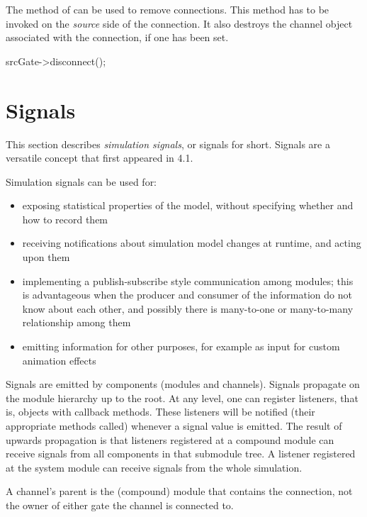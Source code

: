 \begin{ned}
The  method of  can be
used to remove connections. This method has to be invoked
on the \textit{source} side of the connection. It also destroys
the channel object associated with the connection, if one has been set.

\begin{cpp}
srcGate->disconnect();
\end{cpp}



\section{Signals}
\label{sec:simple-modules:signals}

This section describes \textit{simulation signals}, or signals for short.
Signals are a versatile concept that first appeared in {\opp} 4.1.

Simulation signals can be used for:

\begin{itemize}
  \item exposing statistical properties of the model, without specifying
        whether and how to record them
  \item receiving notifications about simulation model changes at runtime, and
        acting upon them
  \item implementing a publish-subscribe style communication among modules;
        this is advantageous when the producer and consumer of the information
        do not know about each other, and possibly there is many-to-one or
        many-to-many relationship among them
  \item emitting information for other purposes, for example as input for
        custom animation effects
\end{itemize}

Signals are emitted by components (modules and channels). Signals propagate on
the module hierarchy up to the root. At any level, one can register listeners,
that is, objects with callback methods. These listeners will be notified (their
appropriate methods called) whenever a signal value is emitted. The result of
upwards propagation is that listeners registered at a compound module can
receive signals from all components in that submodule tree. A listener
registered at the system module can receive signals from the whole simulation.

\begin{note}
    A channel's parent is the (compound) module that contains the connection,
    not the owner of either gate the channel is connected to.
\end{note}


\end{ned}
